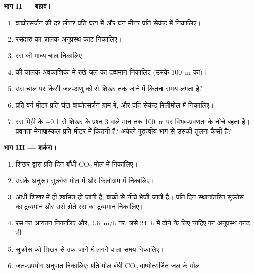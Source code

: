 \begin{problem}
\medskip
\noindent\textbf{भाग II --- बहाव।}
\begin{enumerate}[resume]
  \item वाष्पोत्सर्जन की दर लीटर प्रति घंटा में और घन मीटर प्रति सेकंड
        में निकालिए।
  \item रसदारु का चालक अनुप्रस्थ काट निकालिए।
  \item रस की माध्य चाल निकालिए।
  \item {} की चालक अवकाशिका में रखे जल का द्रव्यमान निकालिए (उसके
        \qty{100}{m} का)।
  \item उस चाल पर किसी जल-अणु को  से शिखर तक जाने में कितना समय
        लगता है?
  \item प्रति वर्ग मीटर  प्रति घंटा वाष्पोत्सर्जन ग्राम में, और
        प्रति सेकंड मिलीमोल में निकालिए।
  \item रस मिट्टी के \qty{-0.1}{} से शिखर के प्रश्न 3 वाले मान तक
        \qty{100}{m} पर विभव-प्रवणता के नीचे बहता है। प्रवणता
        मेगापास्कल प्रति मीटर में कितनी है? अकेले गुरुत्वीय भाग से उसकी
        तुलना कैसी है?
\end{enumerate}

\medskip
\noindent\textbf{भाग III --- शर्करा।}
\begin{enumerate}[resume]
  \item शिखर द्वारा प्रति दिन बाँधी $\mathrm{CO_2}$ मोल में
        निकालिए।
  \item उसके अनुरूप सुक्रोस मोल में और किलोग्राम में निकालिए।
  \item आधी शिखर में ही श्वसित हो जाती है; बाकी  से नीचे भेजी
        जाती है। प्रति दिन स्थानांतरित सुक्रोस का द्रव्यमान और उसे ढोते
        रस का द्रव्यमान निकालिए।
  \item रस का आयतन निकालिए और, \qty{0.6}{m/h} पर, उसे \qty{24}{h} में
        ढोने के लिए चाहिए  का अनुप्रस्थ काट भी।
  \item सुक्रोस को शिखर से  तक जाने में लगने वाला समय निकालिए।
  \item जल-उपयोग अनुपात निकालिए: प्रति मोल बंधी $\mathrm{CO_2}$
        वाष्पोत्सर्जित जल के मोल।
\end{enumerate}


\end{problem}
